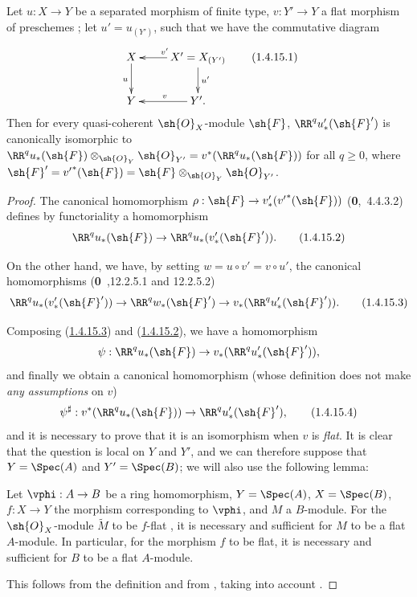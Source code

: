 \begin{proposition}[1.4.15]
\label{III.1.4.15}
Let $u:X\to Y$ be a separated morphism of finite type, $v:Y'\to Y$ a flat morphism of preschemes ; let $u'=u_{(Y')}$, such that we have the commutative diagram
\[
  \xymatrix{
    X\ar[d]_u &
    X'=X_{(Y')}\ar[l]_{v'}\ar[d]^{u'}\\
    Y &
    Y'\ar[l]_{v}.
  }
  \tag{1.4.15.1}
\]
Then for every quasi-coherent $\sh{O}_X$-module $\sh{F}$, $\RR^q u_*'(\sh{F}')$ is canonically isomorphic to $\RR^q u_*(\sh{F})\otimes_{\sh{O}_Y}\sh{O}_{Y'}=v^*(\RR^q u_*(\sh{F}))$ for all $q\geq 0$, where $\sh{F}'={v'}^*(\sh{F})=\sh{F}\otimes_{\sh{O}_Y}\sh{O}_{Y'}$.
\end{proposition}

\begin{proof}
The canonical homomorphism $\rho:\sh{F}\to v_*'({v'}^*(\sh{F}))$ (\textbf{0},~4.4.3.2) defines by functoriality a homomorphism
\[
  \RR^q u_*(\sh{F})\to\RR^q u_*(v_*'(\sh{F}')).
  \tag{1.4.15.2}\label{III.1.4.15.2}
\]

On the other hand, we have, by setting $w=u\circ v'=v\circ u'$, the canonical homomorphisms (\textbf{0}~,12.2.5.1 and 12.2.5.2)
\[
  \RR^q u_*(v_*'(\sh{F}'))\to\RR^q w_*(\sh{F}')\to v_*(\RR^q u_*'(\sh{F}')).
  \tag{1.4.15.3}\label{III.1.4.15.3}
\]

Composing (\hyperref[III.1.4.15.3]{1.4.15.3}) and (\hyperref[III.1.4.15.2]{1.4.15.2}), we have a homomorphism
\[
  \psi:\RR^q u_*(\sh{F})\to v_*(\RR^q u_*'(\sh{F}')),
\]
and finally we obtain a canonical homomorphism (whose definition does not make \emph{any assumptions} on $v$)
\[
  \psi^\sharp:v^*(\RR^q u_*(\sh{F}))\to\RR^q u_*'(\sh{F}'),
  \tag{1.4.15.4}
\]
and it is necessary to prove that it is an isomorphism when $v$ is \emph{flat}.
It is clear that the question is local on $Y$ and $Y'$, and we can therefore suppose that $Y=\Spec(A)$ and $Y'=\Spec(B)$; we will also use the following lemma:
\begin{lemma}[1.4.15.5]
\label{III.1.4.15.5}
Let $\vphi:A\to B$ be a ring homomorphism, $Y=\Spec(A)$, $X=\Spec(B)$, $f:X\to Y$ the morphism corresponding to $\vphi$, and $M$ a $B$-module.
For the $\sh{O}_X$-module $\widetilde{M}$ to be $f$-flat , it is necessary and sufficient for $M$ to be a flat $A$-module.
In particular, for the morphism $f$ to be flat, it is necessary and sufficient for $B$ to be a flat $A$-module.
\end{lemma}

This follows from the definition  and from , taking into account .


\end{proof}
